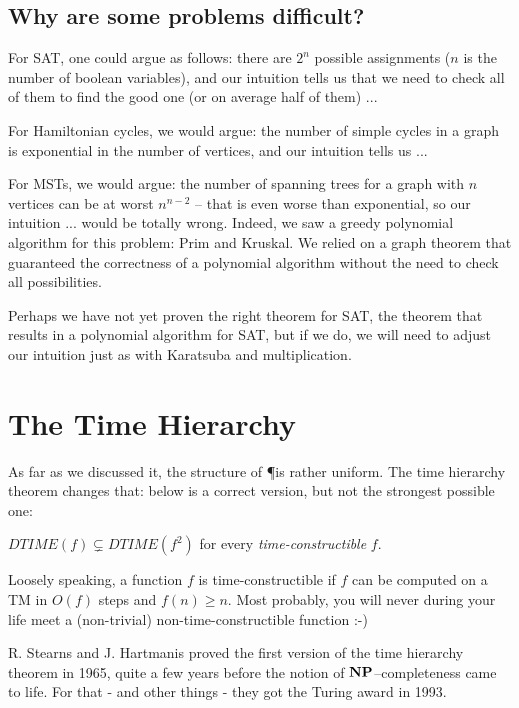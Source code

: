 \subsection{Why are some problems difficult?}

For SAT, one could argue as follows: there are $2^n$ possible
assignments ($n$ is the number of boolean variables), and our
intuition tells us that we need to check all of them to find the good
one (or on average half of them) ...

For Hamiltonian cycles, we would argue: the number of simple cycles in
a graph is exponential in the number of vertices, and our intuition
tells us ...


For MSTs, we would argue: the number of spanning
trees for a graph with $n$ vertices can be at worst $n^{n-2}$ -- that
is even worse than exponential, so our intuition ... would be totally
wrong. Indeed, we saw a greedy polynomial algorithm for this
problem: Prim and Kruskal. We relied on a graph theorem
that guaranteed the correctness of a polynomial algorithm without the
need to check all possibilities.

Perhaps we have not yet proven the right theorem for SAT, the
theorem that results in a polynomial algorithm for SAT, but if we do,
we will need to adjust our intuition just as with Karatsuba and
multiplication.

\section{The Time Hierarchy}\label{timeshierarchie}

As far as we discussed it, the structure of \P is rather uniform.
The time hierarchy theorem changes that: below is a correct version,
but not the strongest possible one:

\begin{theorem}
$DTIME(f) \subsetneq DTIME(f^2)$ for every {\em time-constructible}
$f$.
\end{theorem}

Loosely speaking, a function $f$ is time-constructible if $f$ can be
computed on a TM in $O(f)$ steps and $f(n) \geq n$. Most probably, you
will never during your life meet a (non-trivial)
non-time-constructible function :-)  %

R. Stearns and J. Hartmanis proved the first version of the
time hierarchy theorem in 1965, quite a few years before the notion of
${\bf NP}$--completeness came to life. For that - and other things - they
got the Turing award in 1993.

